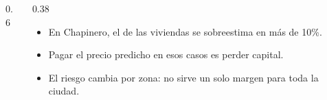 \begin{frame}
  \begin{columns}[c]
    \begin{column}{0.6\textwidth}\centering
    \end{column}
    \begin{column}{0.38\textwidth}
      \begin{itemize}\footnotesize
        \item En Chapinero, el \sobrediezchap{} de las viviendas se sobreestima en más de 10\%.
        \item Pagar el precio predicho en esos casos es perder capital.
        \item El riesgo cambia por zona: no sirve un solo margen para toda la ciudad.
      \end{itemize}
    \end{column}
  \end{columns}
\end{frame}
